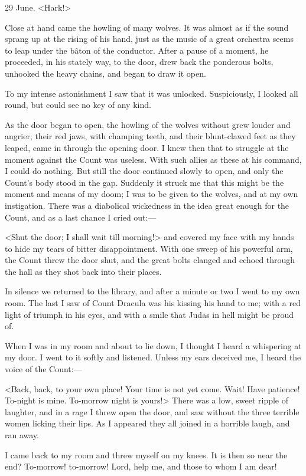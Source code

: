 \begin{diary}{29 June.}
<Hark!>

Close at hand came the howling of many wolves. It was almost as if the sound sprang up at the rising of his hand, just as the music of a great orchestra seems to leap under the bâton of the conductor. After a pause of a moment, he proceeded, in his stately way, to the door, drew back the ponderous bolts, unhooked the heavy chains, and began to draw it open.

To my intense astonishment I saw that it was unlocked. Suspiciously, I looked all round, but could see no key of any kind.

As the door began to open, the howling of the wolves without grew louder and angrier; their red jaws, with champing teeth, and their blunt-clawed feet as they leaped, came in through the opening door. I knew then that to struggle at the moment against the Count was useless. With such allies as these at his command, I could do nothing. But still the door continued slowly to open, and only the Count's body stood in the gap. Suddenly it struck me that this might be the moment and means of my doom; I was to be given to the wolves, and at my own instigation. There was a diabolical wickedness in the idea great enough for the Count, and as a last chance I cried out:—

<Shut the door; I shall wait till morning!> and covered my face with my hands to hide my tears of bitter disappointment. With one sweep of his powerful arm, the Count threw the door shut, and the great bolts clanged and echoed through the hall as they shot back into their places.

In silence we returned to the library, and after a minute or two I went to my own room. The last I saw of Count Dracula was his kissing his hand to me; with a red light of triumph in his eyes, and with a smile that Judas in hell might be proud of.

When I was in my room and about to lie down, I thought I heard a whispering at my door. I went to it softly and listened. Unless my ears deceived me, I heard the voice of the Count:—

<Back, back, to your own place! Your time is not yet come. Wait! Have patience! To-night is mine. To-morrow night is yours!> There was a low, sweet ripple of laughter, and in a rage I threw open the door, and saw without the three terrible women licking their lips. As I appeared they all joined in a horrible laugh, and ran away.

I came back to my room and threw myself on my knees. It is then so near the end? To-morrow! to-morrow! Lord, help me, and those to whom I am dear!
\end{diary}
 
